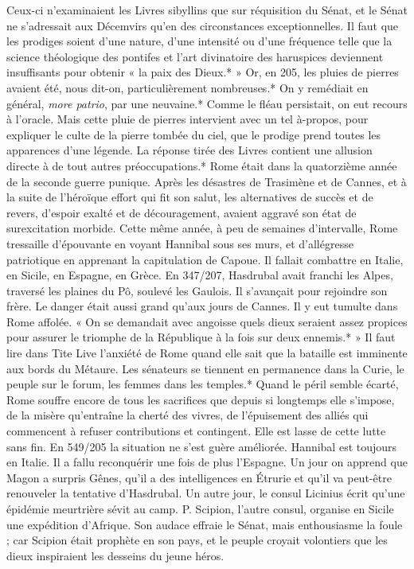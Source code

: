 \documentclass[a4paper, 11pt, oneside, polutonikogreek, french]{article}
\begin{document}
Ceux-ci n'examinaient les Livres sibyllins que sur réquisition du Sénat, et le Sénat ne s'adressait aux Décemvirs qu'en des circonstances exceptionnelles. Il faut que les prodiges soient d'une nature, d'une intensité ou d'une fréquence telle que la science théologique des pontifes et l'art divinatoire des haruspices deviennent insuffisants pour obtenir « la paix des Dieux.* » Or, en 205, les pluies de pierres avaient été, nous dit-on, particulièrement nombreuses.* On y remédiait en général, \emph{more patrio}, par une neuvaine.* Comme le fléau persistait, on eut recours à l'oracle. Mais cette pluie de pierres intervient avec un tel à-propos, pour expliquer le culte de la pierre tombée du ciel, que le prodige prend toutes les apparences d'une légende. La réponse tirée des Livres contient une allusion directe à de tout autres préoccupations.* Rome était dans la quatorzième année de la seconde guerre punique. Après les désastres de Trasimène et de Cannes, et à la suite de l'héroïque effort qui fit son salut, les alternatives de succès et de revers, d'espoir exalté et de découragement, avaient aggravé son état de surexcitation morbide. Cette même année, à peu de semaines d'intervalle, Rome tressaille d'épouvante en voyant Hannibal sous ses murs, et d'allégresse patriotique en apprenant la capitulation de Capoue. Il fallait combattre en Italie, en Sicile, en Espagne, en Grèce. En 347/207, Hasdrubal avait franchi les Alpes, traversé les plaines du Pô, soulevé les Gaulois. Il s'avançait pour rejoindre son frère. Le danger était aussi grand qu'aux jours de Cannes. Il y eut tumulte dans Rome affolée. « On se demandait avec angoisse quels dieux seraient assez propices pour assurer le triomphe de la République à la fois sur deux ennemis.* » Il faut lire dans Tite Live l'anxiété de Rome quand elle sait que la bataille est imminente aux bords du Métaure. Les sénateurs se tiennent en permanence dans la Curie, le peuple sur le forum, les femmes dans les temples.* Quand le péril semble écarté, Rome souffre encore de tous les sacrifices que depuis si longtemps elle s'impose, de la misère qu'entraîne la cherté des vivres, de l'épuisement des alliés qui commencent à refuser contributions et contingent. Elle est lasse de cette lutte sans fin. En 549/205 la situation ne s'est guère améliorée. Hannibal est toujours en Italie. Il a fallu reconquérir une fois de plus l'Espagne. Un jour on apprend que Magon a surpris Gênes, qu'il a des intelligences en Étrurie et qu'il va peut-être renouveler la tentative d'Hasdrubal. Un autre jour, le consul Licinius écrit qu'une épidémie meurtrière sévit au camp. P. Scipion, l'autre consul, organise en Sicile une expédition d'Afrique. Son audace effraie le Sénat, mais enthousiasme la foule ; car Scipion était prophète en son pays, et le peuple croyait volontiers que les dieux inspiraient les desseins du jeune héros.
\end{document}

